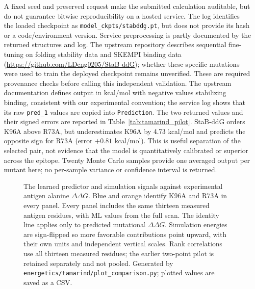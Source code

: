 A fixed seed and preserved request make the submitted calculation auditable, but do not guarantee
bitwise reproducibility on a hosted service. The log identifies the loaded checkpoint as \texttt{model\_ckpts/stabddg.pt}, but does
not provide its hash or a code/environment version. Service preprocessing is partly documented
by the returned structures and log. The upstream repository describes sequential fine-tuning
on folding stability data and SKEMPI binding data
(\url{https://github.com/LDeng0205/StaB-ddG}); whether these specific mutations were used
to train the deployed checkpoint remains unverified. These are required provenance checks before calling this independent validation.
The upstream documentation defines output in kcal/mol with negative values stabilizing binding,
consistent with our experimental convention; the service log shows that its raw \texttt{pred\_1}
values are copied into \texttt{Prediction}. The two returned values and their signed errors are
reported in Table~\ref{tab:tamarind_pilot}. StaB-ddG orders K96A above R73A, but underestimates
K96A by 4.73 kcal/mol and predicts the opposite sign for R73A (error $+0.81$ kcal/mol).
This is useful separation of the selected pair, not evidence that the model is quantitatively
calibrated or superior across the epitope. Twenty Monte Carlo samples provide one averaged output
per mutant here; no per-sample variance or confidence interval is returned.

\begin{table}[htbp]
\centering

\caption{Two separate antigen alanine substitutions in 3HFM. All entries are in kcal/mol;
positive $\Delta\Delta G$ weakens binding. Generated directly from the downloaded output and
stored experimental CSV by \texttt{energetics/tamarind/report\_pilot.py}.}
\label{tab:tamarind_pilot}
\end{table}

\begin{figure}[htbp]
\centering
{}
\caption{The learned predictor and simulation signals against experimental antigen alanine
$\Delta\Delta G$. Blue and orange identify K96A and R73A in every panel. Every panel includes the same thirteen measured antigen residues, with ML values
from the full scan. The identity line applies only to predicted mutational $\Delta\Delta G$. Simulation
energies are sign-flipped so more favorable contributions point upward, with their own units
and independent vertical scales. Rank correlations use all thirteen measured residues; the earlier two-point pilot is
retained separately and not pooled. Generated by
\texttt{energetics/tamarind/plot\_comparison.py}; plotted values are saved as a CSV.}
\label{fig:tamarind_simulation}
\end{figure}

